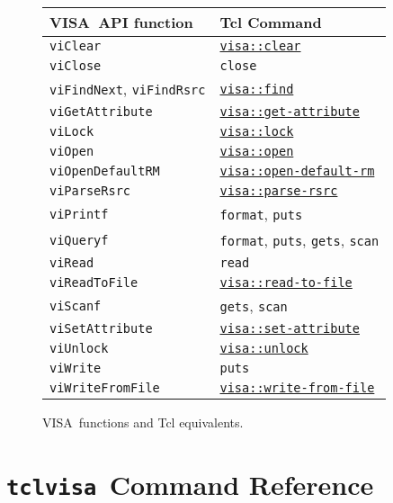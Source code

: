 \documentclass[12pt, a4paper]{report}
\newcommand{\tclvisa}{{\tt tclvisa }}
\newcommand{\VISA}{\mbox{VISA }}
\newcommand{\COMMANDREF}[1]{{\tt \hyperref[#1]{#1}}}
\newcommand{\VISACOMMANDREF}[1]{{\tt \mbox{#1}}\index{#1}}
\newcommand{\TCLCOMMANDREF}[1]{{\tt \mbox{#1}}\index{#1}}
\begin{document}
\begin{figure}
\caption{\VISA functions and Tcl equivalents.}
\label{tabCorrespondence}
\medskip
\begin{tabular}{ll}
\VISA API function & Tcl Command \\
\hline
\VISACOMMANDREF{viClear} & \COMMANDREF{visa::clear}	\\
\VISACOMMANDREF{viClose} & \TCLCOMMANDREF{close}	\\
\VISACOMMANDREF{viFindNext}, \VISACOMMANDREF{viFindRsrc} & \COMMANDREF{visa::find}	\\
\VISACOMMANDREF{viGetAttribute} & \COMMANDREF{visa::get-attribute}	\\
\VISACOMMANDREF{viLock} & \COMMANDREF{visa::lock}	\\
\VISACOMMANDREF{viOpen} & \COMMANDREF{visa::open}	\\
\VISACOMMANDREF{viOpenDefaultRM} & \COMMANDREF{visa::open-default-rm}	\\
\VISACOMMANDREF{viParseRsrc} & \COMMANDREF{visa::parse-rsrc}	\\
\VISACOMMANDREF{viPrintf} & \TCLCOMMANDREF{format}, \TCLCOMMANDREF{puts}	\\
\VISACOMMANDREF{viQueryf} & \TCLCOMMANDREF{format}, \TCLCOMMANDREF{puts}, \TCLCOMMANDREF{gets}, \TCLCOMMANDREF{scan}	\\
\VISACOMMANDREF{viRead} & \TCLCOMMANDREF{read}	\\
\VISACOMMANDREF{viReadToFile} & \COMMANDREF{visa::read-to-file}	\\
\VISACOMMANDREF{viScanf} & \TCLCOMMANDREF{gets}, \TCLCOMMANDREF{scan}	\\
\VISACOMMANDREF{viSetAttribute} & \COMMANDREF{visa::set-attribute}	\\
\VISACOMMANDREF{viUnlock} & \COMMANDREF{visa::unlock}	\\
\VISACOMMANDREF{viWrite} & \TCLCOMMANDREF{puts}	\\
\VISACOMMANDREF{viWriteFromFile} & \COMMANDREF{visa::write-from-file}	\\
\end{tabular}
\end{figure}

\chapter{\tclvisa Command Reference}

\end{document}
